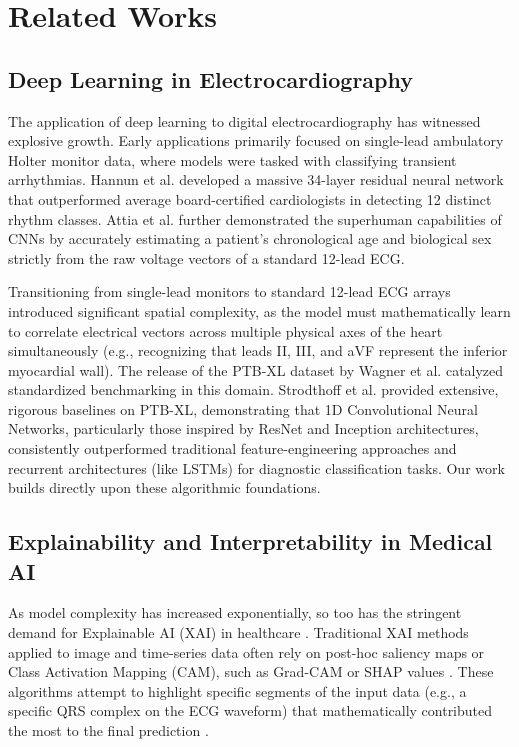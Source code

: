 \documentclass[10pt,twocolumn,letterpaper]{article}
\begin{document}
\section{Related Works}

\subsection{Deep Learning in Electrocardiography}
The application of deep learning to digital electrocardiography has witnessed explosive growth. Early applications primarily focused on single-lead ambulatory Holter monitor data, where models were tasked with classifying transient arrhythmias. Hannun et al. \cite{hannun2019cardiologist} developed a massive 34-layer residual neural network that outperformed average board-certified cardiologists in detecting 12 distinct rhythm classes. Attia et al. \cite{attia2019age} further demonstrated the superhuman capabilities of CNNs by accurately estimating a patient's chronological age and biological sex strictly from the raw voltage vectors of a standard 12-lead ECG.

Transitioning from single-lead monitors to standard 12-lead ECG arrays introduced significant spatial complexity, as the model must mathematically learn to correlate electrical vectors across multiple physical axes of the heart simultaneously (e.g., recognizing that leads II, III, and aVF represent the inferior myocardial wall). The release of the PTB-XL dataset by Wagner et al. \cite{wagner2020ptb} catalyzed standardized benchmarking in this domain. Strodthoff et al. \cite{strodthoff2020deep} provided extensive, rigorous baselines on PTB-XL, demonstrating that 1D Convolutional Neural Networks, particularly those inspired by ResNet and Inception architectures, consistently outperformed traditional feature-engineering approaches and recurrent architectures (like LSTMs) for diagnostic classification tasks. Our work builds directly upon these algorithmic foundations.

\subsection{Explainability and Interpretability in Medical AI}
As model complexity has increased exponentially, so too has the stringent demand for Explainable AI (XAI) in healthcare \cite{amann2020explainability}. Traditional XAI methods applied to image and time-series data often rely on post-hoc saliency maps or Class Activation Mapping (CAM), such as Grad-CAM \cite{selvaraju2017grad} or SHAP values \cite{lundberg2017unified}. These algorithms attempt to highlight specific segments of the input data (e.g., a specific QRS complex on the ECG waveform) that mathematically contributed the most to the final prediction \cite{guidotti2018survey}. 
\end{document}
